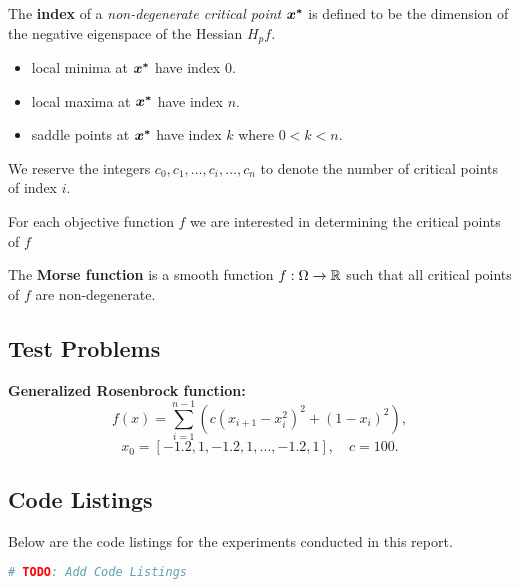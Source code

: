 \documentclass[10pt]{article}
\begin{document}
    \begin{definition}
        The \textbf{index} of a \emph{non-degenerate critical point} $\bm{x^*}$ is defined to be
        the dimension of the negative eigenspace of the Hessian $H_p f$.
        \begin{itemize}
            \item local minima at $\bm{x^*}$ have index $0$.
            \item local maxima at $\bm{x^*}$ have index $n$.
            \item saddle points at $\bm{x^*}$ have index $k$ where $0 < k < n$.
        \end{itemize}
        We reserve the integers $c_0, c_1, \dots, c_i, \dots, c_n$ to denote the number of
        critical points of index $i$.
    \end{definition}

    \begin{remark}
        For each objective function $f$ we are interested in determining the
        critical points of $f$ 
    \end{remark}

    \begin{remark}
        The \textbf{Morse function} is a smooth function $f : \Omega \rightarrow \mathbb{R}$ such that
        all critical points of $f$ are non-degenerate.
    \end{remark}


\subsection{Test Problems}

\textbf{Generalized Rosenbrock function:}
    \[
    f(x) = \sum_{i=1}^{n-1} \left( c(x_{i+1} - x_i^2)^2 + (1 - x_i)^2 \right),
    \]
    \[
    x_0 = [-1.2, 1, -1.2, 1, \dots, -1.2, 1], \quad c = 100.
    \]



\subsection{Code Listings}

Below are the code listings for the experiments conducted in this report.

\lstset{language=julia}
\begin{lstlisting}[language=julia, caption={Algorithm 16.5}]
   # TODO: Add Code Listings
\end{lstlisting}
\newpage




\end{document}
